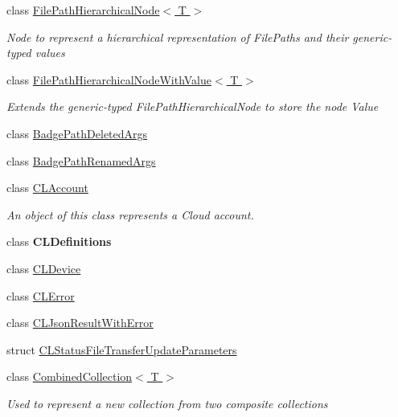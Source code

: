 \begin{DoxyCompactItemize}
class \hyperlink{class_cloud_api_public_1_1_model_1_1_file_path_hierarchical_node_3_01_t_01_4}{File\-Path\-Hierarchical\-Node$<$ T $>$}
\begin{DoxyCompactList}\small\item\em Node to represent a hierarchical representation of File\-Paths and their generic-\/typed values \end{DoxyCompactList}\item 
class \hyperlink{class_cloud_api_public_1_1_model_1_1_file_path_hierarchical_node_with_value_3_01_t_01_4}{File\-Path\-Hierarchical\-Node\-With\-Value$<$ T $>$}
\begin{DoxyCompactList}\small\item\em Extends the generic-\/typed File\-Path\-Hierarchical\-Node to store the node Value \end{DoxyCompactList}\item 
class \hyperlink{class_cloud_api_public_1_1_model_1_1_badge_path_deleted_args}{Badge\-Path\-Deleted\-Args}
\item 
class \hyperlink{class_cloud_api_public_1_1_model_1_1_badge_path_renamed_args}{Badge\-Path\-Renamed\-Args}
\item 
class \hyperlink{class_cloud_api_public_1_1_model_1_1_c_l_account}{C\-L\-Account}
\begin{DoxyCompactList}\small\item\em An object of this class represents a Cloud account. \end{DoxyCompactList}\item 
class {\bfseries C\-L\-Definitions}
\item 
class \hyperlink{class_cloud_api_public_1_1_model_1_1_c_l_device}{C\-L\-Device}
\item 
class \hyperlink{class_cloud_api_public_1_1_model_1_1_c_l_error}{C\-L\-Error}
\item 
class \hyperlink{class_cloud_api_public_1_1_model_1_1_c_l_json_result_with_error}{C\-L\-Json\-Result\-With\-Error}
\item 
struct \hyperlink{struct_cloud_api_public_1_1_model_1_1_c_l_status_file_transfer_update_parameters}{C\-L\-Status\-File\-Transfer\-Update\-Parameters}
\item 
class \hyperlink{class_cloud_api_public_1_1_model_1_1_combined_collection_3_01_t_01_4}{Combined\-Collection$<$ T $>$}
\begin{DoxyCompactList}\small\item\em Used to represent a new collection from two composite collections \end{DoxyCompactList}\item 

\end{DoxyCompactItemize}
